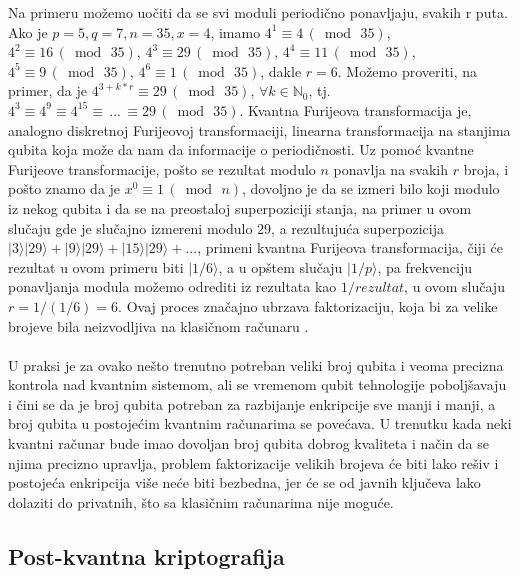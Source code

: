 \documentclass[fleqn, 12pt]{article}
\begin{document}
\begin{text}
Na primeru možemo uočiti da se svi moduli periodično ponavljaju, svakih r puta. Ako je \(p = 5, q = 7, n = 35, x = 4\), imamo \(4^1 \equiv 4\, ( \bmod\, 35)\), \(4^2 \equiv 16\, ( \bmod\, 35)\), \(4^3 \equiv 29\, ( \bmod\, 35)\), \(4^4 \equiv 11\, ( \bmod\, 35)\), \(4^5 \equiv 9\, ( \bmod\, 35)\), \(4^6 \equiv 1\, ( \bmod\, 35)\), dakle \(r = 6\). Možemo proveriti, na primer, da je 
\(4^{3+k*r} \equiv 29\, ( \bmod\, 35)\), \(\forall k \in \mathbb{N}_0\), tj. \(4^3 \equiv 4^9 \equiv 4^{15} \equiv \,... \, \equiv 29\, ( \bmod\, 35)\). Kvantna Furijeova transformacija je, analogno diskretnoj Furijeovoj transformaciji, linearna transformacija na stanjima qubita koja može da nam da informacije o periodičnosti. Uz pomoć kvantne Furijeove transformacije, pošto se rezultat modulo \(n\) ponavlja na svakih \(r\) broja, i pošto znamo da je \(x^0 \equiv 1\, ( \bmod\, n)\), dovoljno je da se izmeri bilo koji modulo iz nekog qubita i da se na preostaloj superpoziciji stanja, na primer u ovom slučaju gde je slučajno izmereni modulo \(29\), a rezultujuća superpozicija \(|3\rangle|29\rangle + |9\rangle|29\rangle + |15\rangle|29\rangle + ...\), primeni kvantna Furijeova transformacija, čiji će rezultat u ovom primeru biti \(|1/6\rangle\), a u opštem slučaju \(|1/p\rangle\), pa frekvenciju ponavljanja modula možemo odrediti iz rezultata kao \(1/rezultat\), u ovom slučaju \(r = 1/(1/6) = 6\). Ovaj proces značajno ubrzava faktorizaciju, koja bi za velike brojeve bila neizvodljiva na klasičnom računaru \cite{G4}.
\\\\

U praksi je za ovako nešto trenutno potreban veliki broj qubita i veoma precizna kontrola nad kvantnim sistemom, ali se vremenom qubit tehnologije poboljšavaju i čini se da je broj qubita potreban za razbijanje enkripcije sve manji i manji, a broj qubita u postojećim kvantnim računarima se povećava. U trenutku kada neki kvantni računar bude imao dovoljan broj qubita dobrog kvaliteta i način da se njima precizno upravlja, problem faktorizacije velikih brojeva će biti lako rešiv i postojeća enkripcija više neće biti bezbedna, jer će se od javnih ključeva lako dolaziti do privatnih, što sa klasičnim računarima nije moguće.
\end{text}

\newpage

\subsection{Post-kvantna kriptografija}
\end{document}
